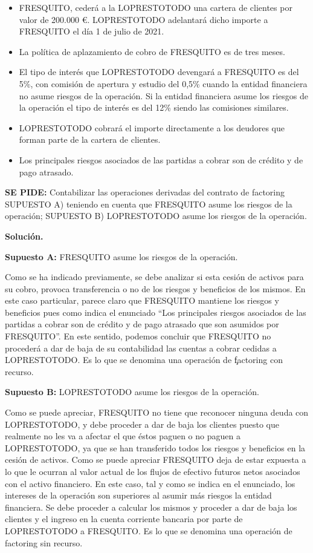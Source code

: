 \begin{itemize}
    \item FRESQUITO, cederá a la LOPRESTOTODO una cartera de clientes por valor de 200.000 €. LOPRESTOTODO adelantará dicho importe a FRESQUITO el día 1 de julio de 2021.
    \item La política de aplazamiento de cobro de FRESQUITO es de tres meses.
    \item El tipo de interés que LOPRESTOTODO devengará a FRESQUITO es del 5\%, con comisión de apertura y estudio del 0,5\% cuando la entidad financiera no asume riesgos de la operación. Si la entidad financiera asume los riesgos de la operación el tipo de interés es del 12\% siendo las comisiones similares.
    \item LOPRESTOTODO cobrará el importe directamente a los deudores que forman parte de la cartera de clientes.
    \item Los principales riesgos asociados de las partidas a cobrar son de crédito y de pago atrasado.
\end{itemize}

\textbf{SE PIDE:} Contabilizar las operaciones derivadas del contrato de factoring SUPUESTO A) teniendo en cuenta que FRESQUITO asume los riesgos de la operación; SUPUESTO B) LOPRESTOTODO asume los riesgos de la operación.

\textbf{Solución.}

\textbf{Supuesto A:} FRESQUITO asume los riesgos de la operación.

Como se ha indicado previamente, se debe analizar si esta cesión de activos para su cobro, provoca transferencia o no de los riesgos y beneficios de los mismos. En este caso particular, parece claro que FRESQUITO mantiene los riesgos y beneficios pues como indica el enunciado “Los principales riesgos asociados de las partidas a cobrar son de crédito y de pago atrasado que son asumidos por FRESQUITO”. En este sentido, podemos concluir que FRESQUITO no procederá a dar de baja de su contabilidad las cuentas a cobrar cedidas a LOPRESTOTODO. Es lo que se denomina una operación de \c{factoring con recurso}.

\textbf{Supuesto B:} LOPRESTOTODO asume los riesgos de la operación.

Como se puede apreciar, FRESQUITO no tiene que reconocer ninguna deuda con LOPRESTOTODO, y debe proceder a dar de baja los clientes puesto que realmente no les va a afectar el que éstos paguen o no paguen a LOPRESTOTODO, ya que se han transferido todos los riesgos y beneficios en la cesión de activos. Como se puede apreciar FRESQUITO deja de estar expuesta a lo que le ocurran al valor actual de los flujos de efectivo futuros netos asociados con el activo financiero. En este caso, tal y como se indica en el enunciado, los intereses de la operación son superiores al asumir más riesgos la entidad financiera. Se debe proceder a calcular los mismos y proceder a dar de baja los clientes y el ingreso en la cuenta corriente bancaria por parte de LOPRESTOTODO a FRESQUITO. Es lo que se denomina una operación de factoring sin recurso.

